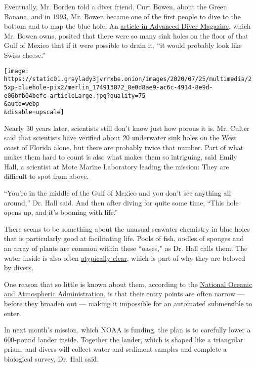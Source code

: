 Eventually, Mr. Borden told a diver friend, Curt Bowen, about the Green
Banana, and in 1993, Mr. Bowen became one of the first people to dive to
the bottom and to map the blue hole. An
\href{http://www.advanceddivermagazine.com/ADMEZINE/GreenBanana.pdf}{article
in Advanced Diver Magazine}, which Mr. Bowen owns, posited that there
were so many sink holes on the floor of that Gulf of Mexico that if it
were possible to drain it, ``it would probably look like Swiss cheese.''

\texttt{[image: https://static01.graylady3jvrrxbe.onion/images/2020/07/25/multimedia/25xp-bluehole-pix2/merlin\_174913872\_8e0d8ae9-ac6c-4914-8e9d-e06bfb04befc-articleLarge.jpg?quality=75\\\&auto=webp\\\&disable=upscale]}

Nearly 30 years later, scientists still don't know just how porous it
is. Mr. Culter said that scientists have verified about 20 underwater
sink holes on the West coast of Florida alone, but there are probably
twice that number. Part of what makes them hard to count is also what
makes them so intriguing, said Emily Hall, a scientist at Mote Marine
Laboratory leading the mission: They are difficult to spot from above.

``You're in the middle of the Gulf of Mexico and you don't see anything
all around,'' Dr. Hall said. And then after diving for quite some time,
``This hole opens up, and it's booming with life.''

There seems to be something about the unusual seawater chemistry in blue
holes that is particularly good at facilitating life. Pools of fish,
oodles of sponges and an array of plants are common within these
``oases,'' as Dr. Hall calls them. The water inside is also often
\href{https://www.nytimes3xbfgragh.onion/2019/11/01/science/blue-holes-hurricanes.html}{atypically
clear}, which is part of why they are beloved by divers.

One reason that so little is known about them, according to the
\href{https://oceanexplorer.noaa.gov/explorations/20blue-holes/welcome.html}{National
Oceanic and Atmospheric Administration}, is that their entry points are
often narrow --- before they broaden out --- making it impossible for an
automated submersible to enter.

In next month's mission, which NOAA is funding, the plan is to carefully
lower a 600-pound lander inside. Together the lander, which is shaped
like a triangular prism, and divers will collect water and sediment
samples and complete a biological survey, Dr. Hall said.

